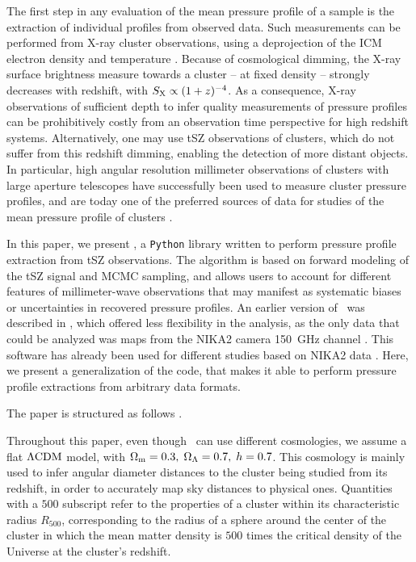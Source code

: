 The first step in any evaluation of the mean pressure profile of a sample is the extraction of individual profiles from observed data.
Such measurements can be performed from X-ray cluster observations, using a deprojection of the ICM electron density and temperature \citep[see \eg][for reviews]{bohringer_x-ray_2010, bohringer_x-ray_2013}.
Because of cosmological dimming, the X-ray surface brightness measure towards a cluster -- at fixed density -- strongly decreases with redshift, with $S_{\rm X} \propto (1+z)^{-4}$.
As a consequence, X-ray observations of sufficient depth to infer quality measurements of pressure profiles can be prohibitively costly from an observation time perspective for high redshift systems.
Alternatively, one may use tSZ observations of clusters, which do not suffer from this redshift dimming, enabling the detection of more distant objects.
In particular, high angular resolution millimeter observations of clusters with large aperture telescopes have successfully been used to measure cluster pressure profiles, and are today one of the preferred sources of data for studies of the mean pressure profile of clusters \citep[\eg][]{mayet_cluster_2020, young_mean_2022, sayers_evolution_2022}.

In this paper, we present \panco, a \texttt{Python} library written to perform pressure profile extraction from tSZ observations.
The algorithm is based on forward modeling of the tSZ signal and MCMC sampling, and allows users to account for different features of millimeter-wave observations that may manifest as systematic biases or uncertainties in recovered pressure profiles.
An earlier version of \panco\ was described in \citet{keruzore_panco2_2021}, which offered less flexibility in the analysis, as the only data that could be analyzed was maps from the NIKA2 camera 150~GHz channel \citep{adam_nika2_2018, perotto_calibration_2020}.
This software has already been used for different studies based on NIKA2 data \citep[\eg][]{artis_psz2_2022,munoz-echeverria_multi-probe_2022,munoz-echeverria_lpsz-clash_2022}.
Here, we present a generalization of the code, that makes it able to perform pressure profile extractions from arbitrary data formats.

The paper is structured as follows \todo.
\textcolor{lightgray}{\lipsum[6]}

Throughout this paper, even though \panco\ can use different cosmologies, we assume a flat $\Lambda {\rm CDM}$ model, with $\Omega_{\rm m} = 0.3, \;\Omega_\Lambda = 0.7, \; h = 0.7$.
This cosmology is mainly used to infer angular diameter distances to the cluster being studied from its redshift, in order to accurately map sky distances to physical ones.
Quantities with a $500$ subscript refer to the properties of a cluster within its characteristic radius $R_{500}$, corresponding to the radius of a sphere around the center of the cluster in which the mean matter density is $500$ times the critical density of the Universe at the cluster's redshift.
